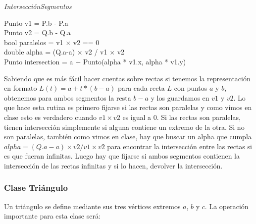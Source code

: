 \begin{algorithm}[H]
	\caption{\textit{IntersecciónSegmentos}}
	Punto v1 = P.b - P.a \\
	Punto v2 = Q.b - Q.a \\
	bool paralelos = v1 $\times$ v2 == 0 \\
	 {
		double alpha = (Q.a-a) $\times$ v2 / v1 $\times$ v2 \\
		Punto intersection = a + Punto(alpha * v1.x, alpha * v1.y)
	}{
		 {}
		 {}
		 {}
		 {}
	}
\end{algorithm}

Sabiendo que es más fácil hacer cuentas sobre rectas si tenemos la representación en formato $L(t)=a+t*(b-a)$ para
cada recta $L$ con puntos $a$ y $b$, obtenemos para ambos segmentos la resta $b-a$ y los guardamos en $v1$ y $v2$.
Lo que hace esta rutina es primero fijarse si las rectas son paralelas y como vimos en clase esto es verdadero
cuando $v1 \times v2$ es igual a 0. Si las rectas son paralelas, tienen intersección simplemente si alguna 
contiene un extremo de la otra. Si no son paralelas, también como vimos en clase, hay que buscar un alpha que
cumpla $alpha = (Q.a-a) \times v2 / v1 \times v2$ para encontrar la intersección entre las rectas si es que
fueran infinitas. Luego hay que fijarse si ambos segmentos contienen la intersección de las rectas infinitas
y si lo hacen, devolver la intersección.

\subsubsection{Clase Triángulo}

Un triángulo se define mediante sus tres vértices extremos $a$, $b$ y $c$.
La operación importante para esta clase será:

